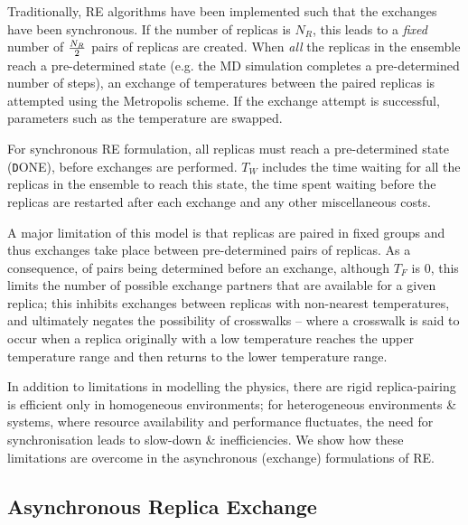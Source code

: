 \documentclass{rspublic}
\begin{document}
Traditionally, RE algorithms have been implemented such that the
exchanges have been synchronous.  If the number of replicas is
${N_R}$, this leads to a {\it fixed} number of ${N_R \over 2}$ pairs
of replicas are created.  When \emph{all} the replicas in the ensemble
reach a pre-determined state (e.g. the MD simulation completes a
pre-determined number of steps), an exchange of temperatures between
the paired replicas is attempted using the Metropolis scheme.  If the
exchange attempt is successful, parameters such as the temperature are
swapped.


For synchronous RE formulation, all replicas must reach a
pre-determined state ({\texttt DONE}), before exchanges are performed.
$T_W$ includes the time waiting for all the replicas in the ensemble
to reach this state, the time spent waiting before the replicas are
restarted after each exchange and any other miscellaneous costs.

A major limitation of this model is that replicas are paired in fixed
groups and thus exchanges take place between pre-determined pairs of
replicas.  As a consequence, of pairs being determined before an
exchange, although $T_F$ is $0$, this limits the number of possible
exchange partners that are available for a given replica; this
inhibits exchanges between replicas with non-nearest temperatures, and
ultimately negates the possibility of crosswalks -- where a crosswalk
is said to occur when a replica originally with a low temperature
reaches the upper temperature range and then returns to the lower
temperature range.

In addition to limitations in modelling the physics, there are rigid
replica-pairing is efficient only in homogeneous environments; for
heterogeneous environments \& systems, where resource availability and
performance fluctuates, the need for synchronisation leads to
slow-down \& inefficiencies. We show how these limitations are
overcome in the asynchronous (exchange) formulations of RE.

\subsection{Asynchronous Replica Exchange}

\end{document}
